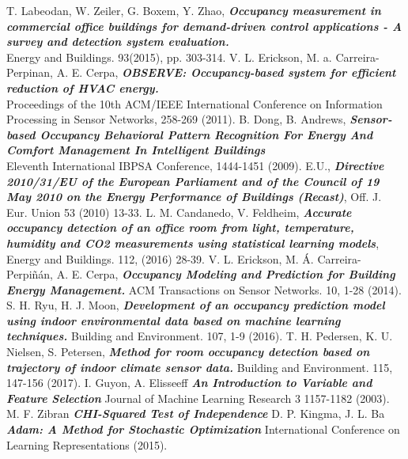 \documentclass[conference]{IEEEtran}
\begin{document}
\begin{thebibliography}{1}
T. Labeodan, W. Zeiler, G. Boxem, Y. Zhao, \emph{\textbf{Occupancy   measurement   in   commercial   office  
buildings   for   demand-driven   control   applications   -   A   survey   and   detection   system   evaluation.}}\\  
Energy and Buildings. 93(2015), pp. 303-314.
V.   L.   Erickson,   M.   a.   Carreira-Perpinan,   A.   E.   Cerpa,    \emph{\textbf{OBSERVE: Occupancy-based system for efficient reduction of HVAC energy.}}\\Proceedings   of   the   10th   ACM/IEEE   International   Conference  
on Information Processing in Sensor Networks, 258-269 (2011).
B.   Dong,   B.   Andrews, \emph{\textbf{Sensor-based   Occupancy   Behavioral   Pattern   Recognition   For   Energy  
And   Comfort   Management   In   Intelligent   Buildings}}\\Eleventh   International   IBPSA   Conference,  
1444-1451 (2009).
E.U., \emph{\textbf{Directive 2010/31/EU of the European Parliament and of the Council of 19
May 2010 on the Energy Performance of Buildings (Recast)}}, Off. J. Eur. Union
53 (2010) 13-33.
L. M. Candanedo, V. Feldheim, \emph{\textbf{Accurate occupancy detection of an office room from light, temperature, humidity and CO2 measurements using statistical learning models}}, Energy and Buildings. 112, (2016) 28-39.
V. L. Erickson, M. Á. Carreira-Perpiñán, A. E. Cerpa, \emph{\textbf{Occupancy Modeling and Prediction for Building Energy Management.}} ACM Transactions on Sensor Networks. 10, 1-28 (2014).
S. H. Ryu, H. J. Moon, \emph{\textbf{Development of an occupancy prediction model using indoor environmental data based on machine learning techniques.}} Building and Environment. 107, 1-9 (2016).
T. H. Pedersen, K. U. Nielsen, S. Petersen, \emph{\textbf{Method for room occupancy detection based on trajectory of indoor climate sensor data.}} Building and Environment. 115, 147-156 (2017).
I. Guyon, A. Elisseeff  \emph{\textbf{An Introduction to Variable and Feature Selection}}
Journal of Machine Learning Research 3  1157-1182 (2003).
M. F. Zibran
\emph{\textbf{CHI-Squared Test of Independence}}
D. P. Kingma, J. L. Ba
\emph{\textbf{Adam: A Method for Stochastic Optimization }}
International Conference on Learning Representations (2015).
\end{thebibliography}




\end{document}
